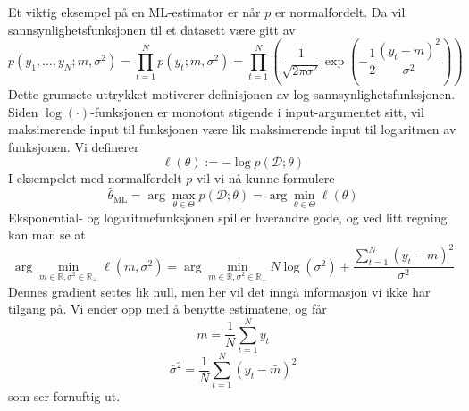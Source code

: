 Et viktig eksempel på en ML-estimator er når $p$ er normalfordelt. Da vil sannsynlighetsfunksjonen til et datasett være gitt av
\begin{equation}
p\left(y_{1}, \ldots, y_{N} ; m, \sigma^{2}\right)=\prod_{t=1}^{N} p\left(y_{t} ; m, \sigma^{2}\right)=\prod_{t=1}^{N}\left(\frac{1}{\sqrt{2 \pi \sigma^{2}}} \exp \left(-\frac{1}{2} \frac{\left(y_{t}-m\right)^{2}}{\sigma^{2}}\right)\right)
\end{equation}
Dette grumsete uttrykket motiverer definisjonen av log-sannsynlighetsfunksjonen. Siden $\log(\cdot)$-funksjonen er monotont stigende i input-argumentet sitt, vil maksimerende input til funksjonen være lik maksimerende input til logaritmen av funksjonen. Vi definerer
\begin{equation}
\ell(\theta):=-\log p(\mathcal{D} ; \theta)
\end{equation}
I eksempelet med normalfordelt $p$ vil vi nå kunne formulere
\begin{equation}
\widehat{\theta}_{\mathrm{ML}}=\arg \max _{\theta \in \Theta} p(\mathcal{D} ; \theta) = \arg \min _{\theta \in \Theta} \ell(\theta)
\end{equation}
Eksponential- og logaritmefunksjonen spiller hverandre gode, og ved litt regning kan man se at
\begin{equation}
\arg \min _{m \in \mathbb{R}, \sigma^{2} \in \mathbb{R}_{+}} \ell\left(m, \sigma^{2}\right)=\arg \min _{m \in \mathbb{R}, \sigma^{2} \in \mathbb{R}_{+}} N \log \left(\sigma^{2}\right)+\frac{\sum_{t=1}^{N}\left(y_{t}-m\right)^{2}}{\sigma^{2}}
\end{equation}
Dennes gradient settes lik null, men her vil det inngå informasjon vi ikke har tilgang på. Vi ender opp med å benytte estimatene, og får
\begin{equation}
\bar{m}=\frac{1}{N} \sum_{t=1}^{N} y_{t}
\end{equation}
\begin{equation}
\bar{\sigma}^{2}=\frac{1}{N} \sum_{t=1}^{N}\left(y_{t}-\bar{m}\right)^{2}
\end{equation}
som ser fornuftig ut.